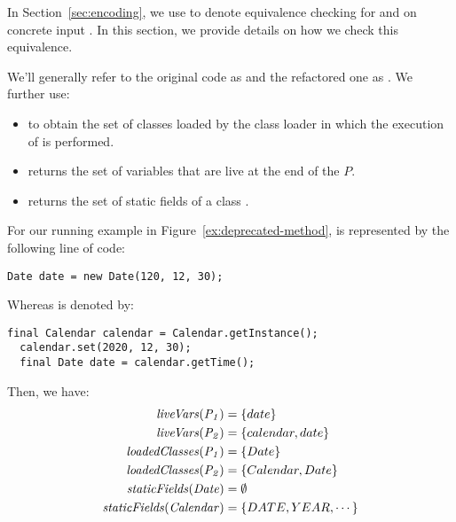 \documentclass[runningheads,a4paper]{llncs}
\begin{document}

In Section~\ref{sec:encoding}, we use  to denote equivalence checking for  and
 on concrete input .
In this section, we provide details on how we check this equivalence.




We'll generally refer to the original code as  and the refactored one
as . We further use:
\begin{itemize}
\item {} to obtain the set of classes loaded by the class loader
  in which the execution of  is performed.
\item {} returns the set of variables that are live
at the end of the $P$. %
\item {} returns
  the set of static fields of a class .
\end{itemize}  

\begin{example}\label{ex:defs}
  For our running example in Figure~\ref{ex:deprecated-method},
   is represented by the following line of code:

\begin{lstlisting}[mathescape=true,showstringspaces=false]
  Date date = new Date(120, 12, 30);
\end{lstlisting}

Whereas  is denoted by:

\begin{lstlisting}[mathescape=true,showstringspaces=false]
  final Calendar calendar = Calendar.getInstance();
  calendar.set(2020, 12, 30);
  final Date date = calendar.getTime();
\end{lstlisting}
  
Then, we have:
\[
\begin{aligned}[t]
  \mathit{{liveVars(P_1)}} &= \{date\}\\
  \mathit{{liveVars(P_2)}} &= \{calendar, date\}\\  
  \mathit{{loadedClasses(P_1)}} &= \{Date\} \\
  \mathit{{loadedClasses(P_2)}} &= \{Calendar, Date\} \\  
  \mathit{{staticFields(Date)}} &= \emptyset\\
  \mathit{{staticFields(Calendar)}} &= \{DATE, YEAR, \cdots\}  
\end{aligned}
\]
\end{example}
\end{document}
